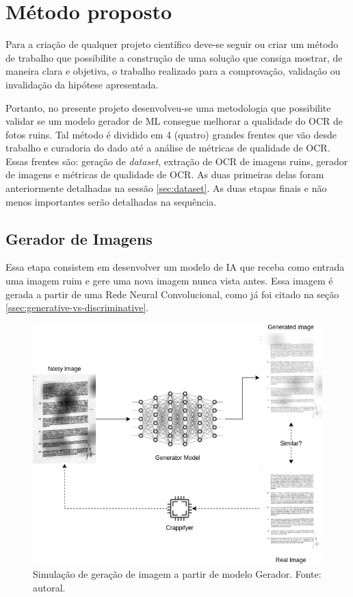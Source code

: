 \section{Método proposto}

Para a criação de qualquer projeto científico deve-se seguir ou criar um método de trabalho que possibilite a construção de uma solução que consiga mostrar, de maneira clara e objetiva, o trabalho realizado para a comprovação, validação ou invalidação da hipótese apresentada.

Portanto, no presente projeto desenvolveu-se uma metodologia que possibilite validar se um modelo gerador de ML consegue melhorar a qualidade do OCR de fotos ruins. Tal método é dividido em 4 (quatro) grandes frentes que vão desde trabalho e curadoria do dado até a análise de métricas de qualidade de OCR. Essas frentes são: geração de \textit{dataset}, extração de OCR de imagens ruins, gerador de imagens e métricas de qualidade de OCR. As duas primeiras delas foram anteriormente detalhadas na sessão \ref{sec:dataset}. As duas etapas finais e não menos importantes serão detalhadas na sequência.

\subsection{Gerador de Imagens}

Essa etapa consistem em desenvolver um modelo de IA que receba como entrada uma imagem ruim e gere uma nova imagem nunca vista antes. Essa imagem é gerada a partir de uma Rede Neural Convolucional, como já foi citado na seção \ref{ssec:generative-vs-discriminative}.

\begin{figure}[H]
  \centering
  \includegraphics[scale=0.6]{figuras/image-generation.png}
  \caption{Simulação de geração de imagem a partir de modelo Gerador. Fonte: autoral.}
  \label{fig:image-generation}
\end{figure}

